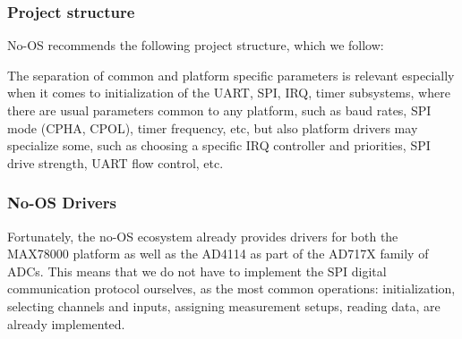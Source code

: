 \documentclass{thesis}
\begin{document}



\subsubsection{Project structure}

No-OS recommends the following project structure, which we follow:

The separation of common and platform specific parameters is relevant especially when it comes to initialization of the UART, SPI, IRQ, timer subsystems, where there are usual parameters common to any platform, such as baud rates, SPI mode (CPHA, CPOL), timer frequency, etc, but also platform drivers may specialize some, such as choosing a specific IRQ controller and priorities, SPI drive strength, UART flow control, etc.

\subsubsection{No-OS Drivers}

Fortunately, the no-OS ecosystem already provides drivers for both the MAX78000 platform as well as the AD4114 as part of the AD717X family of ADCs\cite{ad717x}. This means that we do not have to implement the SPI digital communication protocol ourselves, as the most common operations: initialization, selecting channels and inputs, assigning measurement setups, reading data, are already implemented.
\end{document}
